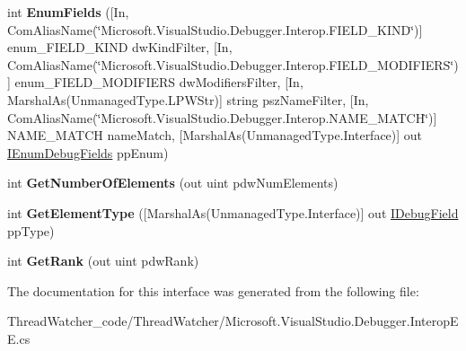 \begin{DoxyCompactItemize}
\item 
\hypertarget{interface_microsoft_1_1_visual_studio_1_1_debugger_1_1_interop_e_e_1_1_i_debug_array_field_aa6e7b037e7f012c7c6aec3fc7f775a34}{int {\bfseries Enum\+Fields} (\mbox{[}In, Com\+Alias\+Name(\char`\"{}Microsoft.\+Visual\+Studio.\+Debugger.\+Interop.\+F\+I\+E\+L\+D\+\_\+\+K\+I\+N\+D\char`\"{})\mbox{]} enum\+\_\+\+F\+I\+E\+L\+D\+\_\+\+K\+I\+N\+D dw\+Kind\+Filter, \mbox{[}In, Com\+Alias\+Name(\char`\"{}Microsoft.\+Visual\+Studio.\+Debugger.\+Interop.\+F\+I\+E\+L\+D\+\_\+\+M\+O\+D\+I\+F\+I\+E\+R\+S\char`\"{})\mbox{]} enum\+\_\+\+F\+I\+E\+L\+D\+\_\+\+M\+O\+D\+I\+F\+I\+E\+R\+S dw\+Modifiers\+Filter, \mbox{[}In, Marshal\+As(Unmanaged\+Type.\+L\+P\+W\+Str)\mbox{]} string psz\+Name\+Filter, \mbox{[}In, Com\+Alias\+Name(\char`\"{}Microsoft.\+Visual\+Studio.\+Debugger.\+Interop.\+N\+A\+M\+E\+\_\+\+M\+A\+T\+C\+H\char`\"{})\mbox{]} N\+A\+M\+E\+\_\+\+M\+A\+T\+C\+H name\+Match, \mbox{[}Marshal\+As(Unmanaged\+Type.\+Interface)\mbox{]} out \hyperlink{interface_microsoft_1_1_visual_studio_1_1_debugger_1_1_interop_e_e_1_1_i_enum_debug_fields}{I\+Enum\+Debug\+Fields} pp\+Enum)}\label{interface_microsoft_1_1_visual_studio_1_1_debugger_1_1_interop_e_e_1_1_i_debug_array_field_aa6e7b037e7f012c7c6aec3fc7f775a34}

\item 
\hypertarget{interface_microsoft_1_1_visual_studio_1_1_debugger_1_1_interop_e_e_1_1_i_debug_array_field_a757ac8fdb892f88995723938fcec2ffd}{int {\bfseries Get\+Number\+Of\+Elements} (out uint pdw\+Num\+Elements)}\label{interface_microsoft_1_1_visual_studio_1_1_debugger_1_1_interop_e_e_1_1_i_debug_array_field_a757ac8fdb892f88995723938fcec2ffd}

\item 
\hypertarget{interface_microsoft_1_1_visual_studio_1_1_debugger_1_1_interop_e_e_1_1_i_debug_array_field_a0c1c04bc82868c6119c78e50a6e8ad65}{int {\bfseries Get\+Element\+Type} (\mbox{[}Marshal\+As(Unmanaged\+Type.\+Interface)\mbox{]} out \hyperlink{interface_microsoft_1_1_visual_studio_1_1_debugger_1_1_interop_e_e_1_1_i_debug_field}{I\+Debug\+Field} pp\+Type)}\label{interface_microsoft_1_1_visual_studio_1_1_debugger_1_1_interop_e_e_1_1_i_debug_array_field_a0c1c04bc82868c6119c78e50a6e8ad65}

\item 
\hypertarget{interface_microsoft_1_1_visual_studio_1_1_debugger_1_1_interop_e_e_1_1_i_debug_array_field_a040c1a3a19461b104a4834ea5e6f00df}{int {\bfseries Get\+Rank} (out uint pdw\+Rank)}\label{interface_microsoft_1_1_visual_studio_1_1_debugger_1_1_interop_e_e_1_1_i_debug_array_field_a040c1a3a19461b104a4834ea5e6f00df}

\end{DoxyCompactItemize}


The documentation for this interface was generated from the following file\+:\begin{DoxyCompactItemize}
\item 
Thread\+Watcher\+\_\+code/\+Thread\+Watcher/Microsoft.\+Visual\+Studio.\+Debugger.\+Interop\+E\+E.\+cs\end{DoxyCompactItemize}
